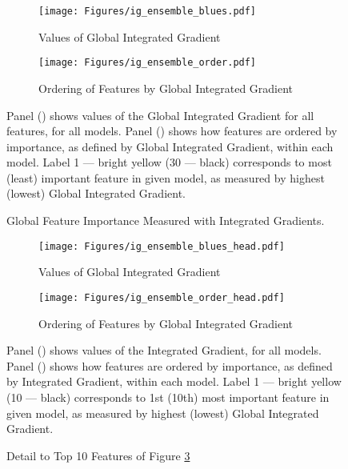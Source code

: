 		\begin{figure}	
			\centering		
			\begin{subfigure}[t]{\textwidth}
				\texttt{[image: Figures/ig\_ensemble\_blues.pdf]}
				\caption{Values of Global Integrated Gradient}
				\label{fig:ig_ensemble_blues}
			\end{subfigure}
		
			\begin{subfigure}[t]{\textwidth}
				\centering
				\texttt{[image: Figures/ig\_ensemble\_order.pdf]}
				\caption{Ordering of Features by Global Integrated Gradient}
				\label{fig:ig_ensemble_order}
			\end{subfigure}
			\caption{Global Feature Importance Measured with Integrated Gradients.}
			\medskip
			\small
			Panel () shows values of the Global Integrated Gradient for all features, for all models.  Panel () shows how features are ordered by importance, as defined by Global Integrated Gradient, within each model. Label 1 --- bright yellow (30 --- black) corresponds to most (least) important feature in given model, as measured by highest (lowest) Global Integrated Gradient.  
			\label{fig:ig_ensemble}
		\end{figure}
		
		\begin{figure}	
			\centering		
			\begin{subfigure}[t]{\textwidth}
				\texttt{[image: Figures/ig\_ensemble\_blues\_head.pdf]}
				\caption{Values of Global Integrated Gradient}
				\label{fig:ig_ensemble_blues_head}
			\end{subfigure}
			
			\begin{subfigure}[t]{\textwidth}
				\centering
				\texttt{[image: Figures/ig\_ensemble\_order\_head.pdf]}
				\caption{Ordering of Features by Global Integrated Gradient}
				\label{fig:ig_ensemble_order_head}
			\end{subfigure}
			\caption{Detail to Top 10 Features of Figure \ref{fig:ig_ensemble}} 
			\medskip
			\small
			Panel () shows values of the Integrated Gradient, for all models.  Panel () shows how features are ordered by importance, as defined by Integrated Gradient, within each model. Label 1 --- bright yellow (10 --- black) corresponds to 1st (10th) most  important feature in given model, as measured by highest (lowest) Global Integrated Gradient.  
			\label{fig:ig_ensemble_head}
		\end{figure}
		
